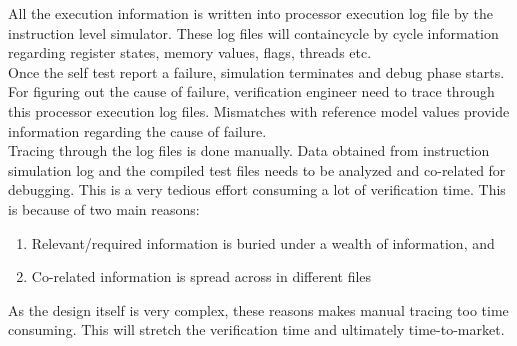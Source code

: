 All the execution information is written into processor execution log file by the instruction level simulator. These log files will containcycle by cycle information regarding register states, memory values, flags, threads etc. \\

Once the self test report a failure, simulation terminates and debug phase starts. For figuring out the cause of failure, verification engineer need to trace through this processor execution log files. Mismatches with reference model values provide information regarding the cause of failure. \\

Tracing through the log files is done manually. Data obtained from instruction simulation log and the compiled test files needs to be analyzed and co-related for debugging. This is a very tedious effort consuming a lot of verification time. This is because of two main reasons:

\begin{enumerate}
	\item Relevant/required information is buried under a wealth of information, and
	\item Co-related information is spread across in different files
\end{enumerate}

As the design itself is very complex, these reasons makes manual tracing too time consuming. This will stretch the verification time and ultimately time-to-market.   


